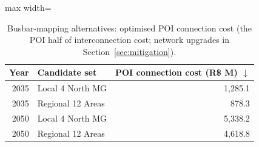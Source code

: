 \begin{table}[!htbp]
\centering
\small
\caption{Busbar-mapping alternatives: optimised POI connection cost (the POI half of interconnection cost; network upgrades in Section~\ref{sec:mitigation}).}
\label{tab:regional}
\begin{adjustbox}{max width=\linewidth}
\begin{tabular}{rlr}
\toprule
Year & Candidate set & POI connection cost (R\$ M) $\downarrow$ \\
\midrule
2035 & Local 4 North MG & 1,285.1 \\
2035 & Regional 12 Areas & 878.3 \\
2050 & Local 4 North MG & 5,338.2 \\
2050 & Regional 12 Areas & 4,618.8 \\
\bottomrule
\end{tabular}
\end{adjustbox}
\end{table}
